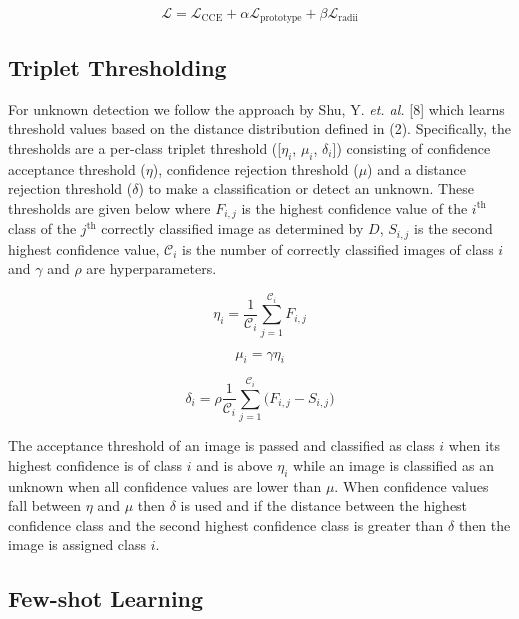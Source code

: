 \documentclass[conference]{IEEEtran}
\begin{document}
\begin{equation}
\mathcal{L} = \mathcal{L}_{\text{CCE}} + \alpha \mathcal{L}_{\text{prototype}} + \beta \mathcal{L}_{\text{radii}}
\end{equation}


\subsection{Triplet Thresholding}

For unknown detection we follow the approach by Shu, Y. \textit{et. al.} [8] which learns threshold values based on the distance distribution defined in (2). Specifically, the thresholds are a per-class triplet threshold ([$\eta_i$, $\mu_i$, $\delta_i$]) consisting of confidence acceptance threshold ($\eta$), confidence rejection threshold ($\mu$) and a distance rejection threshold ($\delta$) to make a classification or detect an unknown. These thresholds are given below where $F_{i, j}$ is the highest confidence value of the $i^{\text{th}}$ class of the $j^{\text{th}}$ correctly classified image as determined by $D$, $S_{i, j}$ is the second highest confidence value, $\mathcal{C}_i$ is the number of correctly classified images of class $i$ and $\gamma$ and $\rho$ are hyperparameters.

\begin{equation}
\eta_i = \frac{1}{\mathcal{C}_i} \sum_{j = 1}^{\mathcal{C}_i} F_{i, j}
\end{equation}

\begin{equation}
\mu_i = \gamma \eta_i
\end{equation}

\begin{equation}
\delta_i = \rho \frac{1}{\mathcal{C}_i} \sum_{j = 1}^{\mathcal{C}_i} \bigg( F_{i, j} - S_{i, j} \bigg)
\end{equation}

The acceptance threshold of an image is passed and classified as class $i$ when its highest confidence is of class $i$ and is above $\eta_i$ while an image is classified as an unknown when all confidence values are lower than $\mu$. When confidence values fall between $\eta$ and $\mu$ then $\delta$ is used and if the distance between the highest confidence class and the second highest confidence class is greater than $\delta$ then the image is assigned class $i$.

\subsection{Few-shot Learning}
\end{document}
